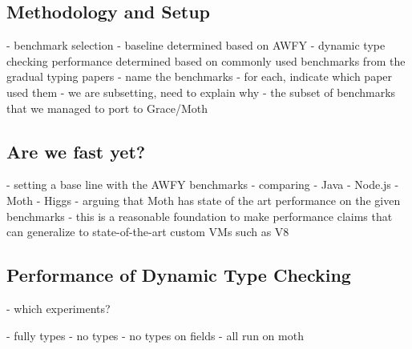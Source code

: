
\subsection{Methodology and Setup}

\begin{cnote}
- benchmark selection
 - baseline determined based on AWFY
 - dynamic type checking performance determined based on commonly used
   benchmarks from the gradual typing papers
   - name the benchmarks
   - for each, indicate which paper used them
   - we are subsetting, need to explain why
     - the subset of benchmarks that we managed to port to Grace/Moth
\end{cnote}

\subsection{Are we fast yet?}
\label{sec:baseline-perf}

\begin{cnote}
- setting a base line with the AWFY benchmarks
- comparing
  - Java
  - Node.js
  - Moth
  - Higgs
- arguing that Moth has state of the art performance on the given benchmarks
- this is a reasonable foundation to make performance claims
  that can generalize to state-of-the-art custom VMs such as V8
\end{cnote}

\subsection{Performance of Dynamic Type Checking}

\begin{cnote}
  - which experiments?
  
  - fully types
  - no types
  - no types on fields
  - all run on moth

\end{cnote}

